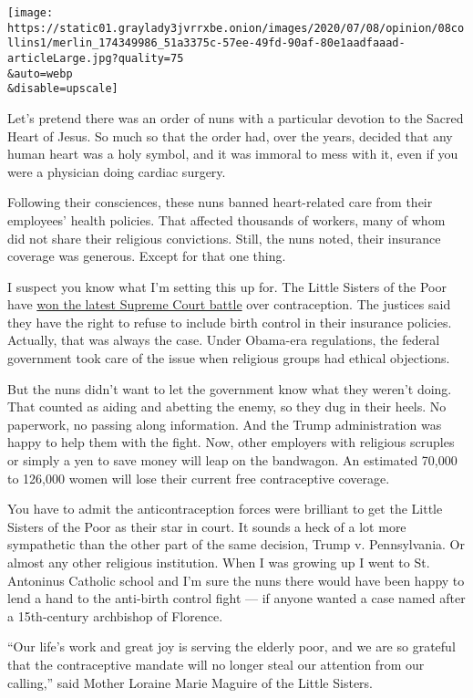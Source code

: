 \texttt{[image: https://static01.graylady3jvrrxbe.onion/images/2020/07/08/opinion/08collins1/merlin\_174349986\_51a3375c-57ee-49fd-90af-80e1aadfaaad-articleLarge.jpg?quality=75\\\&auto=webp\\\&disable=upscale]}

Let's pretend there was an order of nuns with a particular devotion to
the Sacred Heart of Jesus. So much so that the order had, over the
years, decided that any human heart was a holy symbol, and it was
immoral to mess with it, even if you were a physician doing cardiac
surgery.

Following their consciences, these nuns banned heart-related care from
their employees' health policies. That affected thousands of workers,
many of whom did not share their religious convictions. Still, the nuns
noted, their insurance coverage was generous. Except for that one thing.

I suspect you know what I'm setting this up for. The Little Sisters of
the Poor have
\href{https://www.nytimes3xbfgragh.onion/2020/07/08/us/supreme-court-birth-control-obamacare.html}{won
the latest Supreme Court battle} over contraception. The justices said
they have the right to refuse to include birth control in their
insurance policies. Actually, that was always the case. Under Obama-era
regulations, the federal government took care of the issue when
religious groups had ethical objections.

But the nuns didn't want to let the government know what they weren't
doing. That counted as aiding and abetting the enemy, so they dug in
their heels. No paperwork, no passing along information. And the Trump
administration was happy to help them with the fight. Now, other
employers with religious scruples or simply a yen to save money will
leap on the bandwagon. An estimated 70,000 to 126,000 women will lose
their current free contraceptive coverage.

You have to admit the anticontraception forces were brilliant to get the
Little Sisters of the Poor as their star in court. It sounds a heck of a
lot more sympathetic than the other part of the same decision, Trump v.
Pennsylvania. Or almost any other religious institution. When I was
growing up I went to St. Antoninus Catholic school and I'm sure the nuns
there would have been happy to lend a hand to the anti-birth control
fight --- if anyone wanted a case named after a 15th-century archbishop
of Florence.

``Our life's work and great joy is serving the elderly poor, and we are
so grateful that the contraceptive mandate will no longer steal our
attention from our calling,'' said Mother Loraine Marie Maguire of the
Little Sisters.


